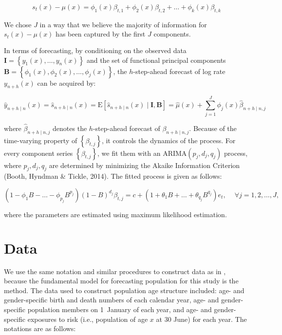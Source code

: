 \documentclass[11pt,a4paper,]{article}
\begin{document}
\begin{equation*}
  s_t(x)-\mu(x) = \phi_1(x)\beta_{t,1}+\phi_2(x)\beta_{t,2}+\dots+\phi_k(x)\beta_{t,k}
\end{equation*}

We chose \(J\) in a way that we believe the majority of information for
\(s_t(x)-\mu(x)\) has been captured by the first \(J\) components.

In terms of forecasting, by conditioning on the observed data
\(\bm{I}=\left\{{y_1(x),\dots,y_n(x)}\right\}\) and the set of
functional principal components
\(\bm{B}=\left\{{\phi_1(x),\phi_2(x),\dots,\phi_j(x)}\right\}\), the
\(h\)-step-ahead forecast of log rate \(y_{n+h}(x)\) can be acquired by:

\begin{equation}
  \widehat{y}_{n+h\mid n}(x)=\widehat{s}_{n+h\mid n}(x) = \text{E}[\widehat{s}_{n+h\mid n}(x)\mid \bm{I, B}] = \widehat{\mu}(x)+\sum_{j=1}^{J}\phi_j(x)\widehat{\beta}_{n+h\mid n,j}
\end{equation}

where \(\widehat{\beta}_{n+h\mid n,j}\) denotes the \(h\)-step-ahead
forecast of \(\beta_{n+h\mid n,j}\). Because of the time-varying
property of \(\left\{\beta_{t,j}\right\}\), it controls the dynamics of
the process. For every component series \(\left\{\beta_{t,j}\right\}\),
we fit them with an ARIMA\((p_j,d_j,q_j)\) process, where
\(p_j,d_j,q_j\) are determined by minimizing the Akaike Information
Criterion (Booth, Hyndman \& Tickle, 2014). The fitted process is given
as follows:

\begin{equation*}
  (1-\phi_1B-\dots-\phi_{p_j}B^{p_j})(1-B)^{d_j}\beta_{t,j}=c+(1+\theta_1B+\dots+\theta_{q_j}B^{q_j})e_t, \quad ~\forall j=1,2,\dots,J,
\end{equation*}

where the parameters are estimated using maximum likelihood estimation.

\section{Data}\label{sec:data}

We use the same notation and similar procedures to construct data as in
\textcite{HB08}, because the fundamental model for forecasting
population for this study is the \textcite{HU07} method. The data used
to construct population age structure included: age- and gender-specific
birth and death numbers of each calendar year, age- and gender-specific
population members on 1~January of each year, and age- and
gender-specific exposures to risk (i.e., population of age \(x\) at 30
June) for each year. The notations are as follows:
\end{document}
